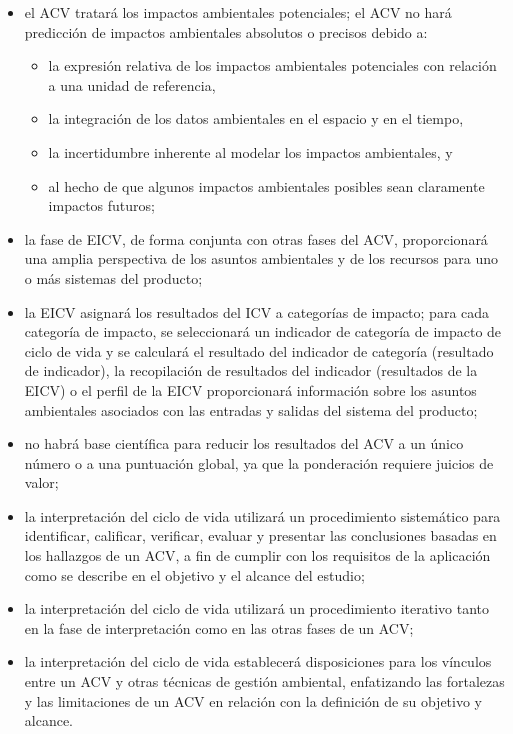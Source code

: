 \begin{itemize}
  \item el ACV tratará los impactos ambientales potenciales; el ACV no hará predicción de impactos ambientales absolutos o precisos debido a:
  \begin{itemize}
    \item la expresión relativa de los impactos ambientales potenciales con relación a una unidad de referencia,
    \item la integración de los datos ambientales en el espacio y en el tiempo,
    \item la incertidumbre inherente al modelar los impactos ambientales, y
    \item al hecho de que algunos impactos ambientales posibles sean claramente impactos futuros;
  \end{itemize}
  \item la fase de EICV, de forma conjunta con otras fases del ACV, proporcionará una amplia perspectiva de los asuntos ambientales y de los recursos para uno o más sistemas del producto;
  \item la EICV asignará los resultados del ICV a categorías de impacto; para cada categoría de impacto, se seleccionará un indicador de categoría de impacto de ciclo de vida y se calculará el resultado del indicador de categoría (resultado de indicador), la recopilación de resultados del indicador (resultados de la EICV) o el perfil de la EICV proporcionará información sobre los asuntos ambientales asociados con las entradas y salidas del sistema del producto;
  \item no habrá base científica para reducir los resultados del ACV a un único número o a una puntuación global, ya que la ponderación requiere juicios de valor;
  \item la interpretación del ciclo de vida utilizará un procedimiento sistemático para identificar, calificar, verificar, evaluar y presentar las conclusiones basadas en los hallazgos de un ACV, a fin de cumplir con los requisitos de la aplicación como se describe en el objetivo y el alcance del estudio;
  \item la interpretación del ciclo de vida utilizará un procedimiento iterativo tanto en la fase de interpretación como en las otras fases de un ACV;
  \item la interpretación del ciclo de vida establecerá disposiciones para los vínculos entre un ACV y otras técnicas de gestión ambiental, enfatizando las fortalezas y las limitaciones de un ACV en relación con la definición de su objetivo y alcance.
\end{itemize}

